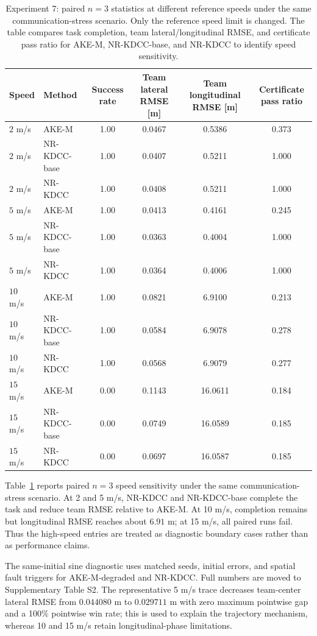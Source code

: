 \documentclass[twocolumn,3p,times,procedia]{elsarticle}
\newcommand{\AKE}{AKE-M}
\newcommand{\Method}{NR-KDCC}
\newcommand{\AKEdeg}{AKE-M-degraded}
\newcommand{\MethodBase}{NR-KDCC-base}
\begin{document}
\begin{table}[!t]
\centering
\caption{Experiment 7: paired $n=3$ statistics at different reference speeds under the same communication-stress scenario. Only the reference speed limit is changed. The table compares task completion, team lateral/longitudinal RMSE, and certificate pass ratio for \AKE{}, \MethodBase{}, and \Method{} to identify speed sensitivity.}
\label{tab:speed_sensitivity}
\footnotesize
\begin{tabular}{llcccc}
\toprule
Speed & Method & Success rate & Team lateral RMSE [m] & Team longitudinal RMSE [m] & Certificate pass ratio \\
\midrule
$2$ m/s & \AKE{} & 1.00 & 0.0467 & 0.5386 & 0.373\\
$2$ m/s & \MethodBase{} & 1.00 & 0.0407 & 0.5211 & 1.000\\
$2$ m/s & \Method{} & 1.00 & 0.0408 & 0.5211 & 1.000\\
$5$ m/s & \AKE{} & 1.00 & 0.0413 & 0.4161 & 0.245\\
$5$ m/s & \MethodBase{} & 1.00 & 0.0363 & 0.4004 & 1.000\\
$5$ m/s & \Method{} & 1.00 & 0.0364 & 0.4006 & 1.000\\
$10$ m/s & \AKE{} & 1.00 & 0.0821 & 6.9100 & 0.213\\
$10$ m/s & \MethodBase{} & 1.00 & 0.0584 & 6.9078 & 0.278\\
$10$ m/s & \Method{} & 1.00 & 0.0568 & 6.9079 & 0.277\\
$15$ m/s & \AKE{} & 0.00 & 0.1143 & 16.0611 & 0.184\\
$15$ m/s & \MethodBase{} & 0.00 & 0.0749 & 16.0589 & 0.185\\
$15$ m/s & \Method{} & 0.00 & 0.0697 & 16.0587 & 0.185\\
\bottomrule
\end{tabular}
\end{table}

Table~\ref{tab:speed_sensitivity} reports paired $n=3$ speed sensitivity under the same communication-stress scenario. At 2 and 5 m/s, \Method{} and \MethodBase{} complete the task and reduce team RMSE relative to \AKE{}. At 10 m/s, completion remains but longitudinal RMSE reaches about $6.91$ m; at 15 m/s, all paired runs fail. Thus the high-speed entries are treated as diagnostic boundary cases rather than as performance claims.

The same-initial sine diagnostic uses matched seeds, initial errors, and spatial fault triggers for \AKEdeg{} and \Method{}. Full numbers are moved to Supplementary Table S2. The representative 5 m/s trace decreases team-center lateral RMSE from $0.044080$ m to $0.029711$ m with zero maximum pointwise gap and a 100\% pointwise win rate; this is used to explain the trajectory mechanism, whereas 10 and 15 m/s retain longitudinal-phase limitations.
\end{document}
